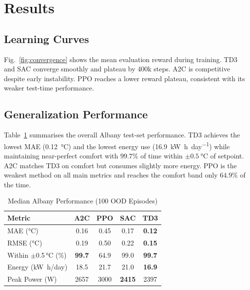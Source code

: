 \documentclass[conference]{IEEEtran}
\begin{document}
\section{Results}
\label{sec:results}

\subsection{Learning Curves}
\label{subsec:learning-curves}
Fig.~\ref{fig:convergence} shows the mean evaluation reward during training.
TD3 and SAC converge smoothly and plateau by 400k steps. A2C is competitive
despite early instability. PPO reaches a lower reward plateau, consistent
with its weaker test-time performance.

\subsection{Generalization Performance}
\label{subsec:generalisation}
Table~\ref{tab:results} summarises the overall Albany test-set
performance. TD3 achieves the lowest MAE (\SI{0.12}{\degreeCelsius})
and the lowest energy use (\SI{16.9}{\kilo\watt\hour\per day}) while
maintaining near-perfect comfort with $99.7\%$ of time within
$\pm\SI{0.5}{\degreeCelsius}$ of setpoint. A2C matches TD3 on comfort
but consumes slightly more energy. PPO is the weakest method on all main
metrics and reaches the comfort band only $64.9\%$ of the time.

\begin{table}[htb]
  \centering
  \caption{Median Albany Performance (100 OOD Episodes)}
  \label{tab:results}
  \begin{tabular}{lcccc}
    \toprule
    \textbf{Metric}
      & \textbf{A2C} & \textbf{PPO} & \textbf{SAC} & \textbf{TD3} \\
    \midrule
    MAE (\si{\degreeCelsius})
      & 0.16 & 0.45 & 0.17 & \textbf{0.12} \\
    RMSE (\si{\degreeCelsius})
      & 0.19 & 0.50 & 0.22 & \textbf{0.15} \\
    Within $\pm$0.5\,\si{\degreeCelsius} (\%)
      & \textbf{99.7} & 64.9 & 99.0 & \textbf{99.7} \\
    Energy (\si{\kilo\watt\hour/day})
      & 18.5 & 21.7 & 21.0 & \textbf{16.9} \\
    Peak Power (\si{\watt})
      & 2657 & 3000 & \textbf{2415} & 2397 \\
    \bottomrule
  \end{tabular}
\end{table}
\end{document}
